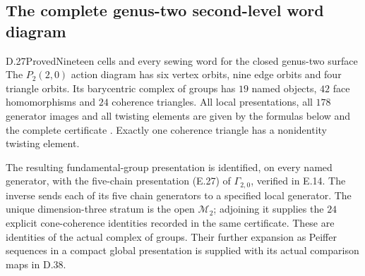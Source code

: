 \subsection{The complete genus-two second-level word diagram}

\begin{result}{D.27}{Proved}{Nineteen cells and every sewing word for the closed genus-two surface}
The $P_2(2,0)$ action diagram has six vertex orbits, nine edge
orbits and four triangle orbits.  Its barycentric complex of
groups has $19$ named objects, $42$ face homomorphisms and
$24$ coherence triangles.  All local presentations, all $178$
generator images and all twisting elements are given by the
formulas below and the complete certificate
.  Exactly one coherence triangle
has a nonidentity twisting element.

The resulting fundamental-group presentation is identified,
on every named generator, with the five-chain presentation (E.27) of
$\Gamma_{2,0}$, verified in E.14.  The inverse sends each of its five
chain generators to a specified local generator.  The unique
dimension-three stratum is the open $\mathcal M_2$; adjoining
it supplies the $24$ explicit cone-coherence identities recorded
in the same certificate.  These are identities of the actual
complex of groups.  Their further expansion as Peiffer
sequences in a compact global presentation is supplied
with its actual comparison maps in D.38.
\end{result}

